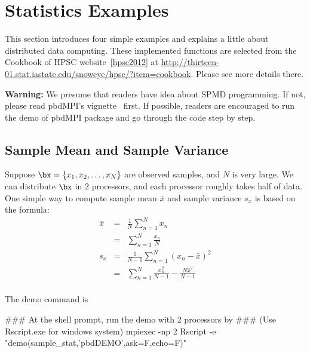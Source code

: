
\section[Statistics Examples]{Statistics Examples}
\label{sec:statistics_examples}

This section introduces four simple examples and explains a little about
distributed data computing. These implemented functions are
selected from the Cookbook of HPSC website~\ref{hpsc2012} at
\url{http://thirteen-01.stat.iastate.edu/snoweye/hpsc/?item=cookbook}.
Please see more details there.

{\color{red} \bf Warning:}
We presume that readers have idea about SPMD programming. If not,
please read pbdMPI's vignette~\cite{Chen2012pbdMPIvignette} first.
If possible, readers are encouraged to run the demo of pbdMPI package
and go through the code step by step.




\subsection[Sample Mean and Sample Variance]{Sample Mean and Sample Variance}
\label{sec:sample_stat}

Suppose $\bx = \{x_1, x_2, \ldots, x_N\}$
are observed samples, and $N$ is very large.
We can distribute $\bx$ in 2 processors, and each processor roughly
takes half of data. One simple way to compute sample mean $\bar{x}$ and
sample variance $s_x$ is based on the formula:
$$
\begin{array}{rcl}
\bar{x} & = & \frac{1}{N} \sum_{n = 1}^N x_n \\
        & = & \sum_{n = 1}^N \frac{x_n}{N} \\
s_x     & = & \frac{1}{N - 1} \sum_{n = 1}^N (x_n - \bar{x})^2 \\
        & = & \sum_{n = 1}^N \frac{x^2_n}{N-1} - \frac{N \bar{x}^2}{N-1} \\
\end{array}
$$

The demo command is
\begin{Command}
### At the shell prompt, run the demo with 2 processors by
### (Use Rscript.exe for windows system)
mpiexec -np 2 Rscript -e "demo(sample_stat,'pbdDEMO',ask=F,echo=F)"
\end{Command}

